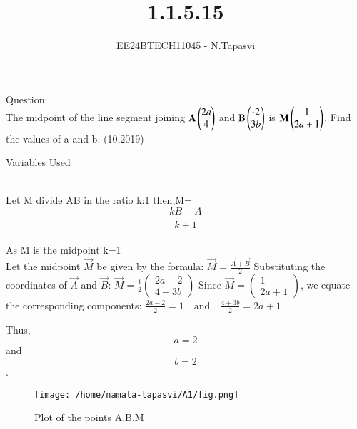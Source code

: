\documentclass[journal]{IEEEtran}
\begin{document}

\vspace{3cm}

\title{1.1.5.15}
\author{EE24BTECH11045 - N.Tapasvi}
{\let\newpage\relax\maketitle}
Question:\\
The midpoint of the line segment joining $\mathbf{A}\begin{pmatrix}2a\\4\end{pmatrix}$ and $\mathbf{B}\begin{pmatrix}\text{-}2\\3b\end{pmatrix}$ is $\mathbf{M}\begin{pmatrix}1\\2a+1\end{pmatrix}$. Find the values of a and b.
\hfill (10,2019)

\solution
\begin{table}[h!]    
  \centering
  
  \caption{Variables Used}
  \label{tab1-1.5-15}
\end{table}\\

Let M divide AB in the ratio k:1
then,M=$$\frac{kB+A}{k+1}$$\\

As M is the midpoint k=1\\

Let the midpoint $\vec{M}$ be given by the formula:
$\vec{M} = \frac{\vec{A} + \vec{B}}{2}$
Substituting the coordinates of $\vec{A}$ and $\vec{B}$:
$\vec{M} = \frac{1}{2} \begin{pmatrix} 2a - 2 \\ 4 + 3b \end{pmatrix}$
Since $\vec{M} = \begin{pmatrix} 1 \\ 2a+1 \end{pmatrix}$, we equate the corresponding components:
$\frac{2a - 2}{2} = 1 \quad \text{and} \quad \frac{4 + 3b}{2} = 2a + 1$

Thus, $$a = 2$$ and $$b = 2$$.


\begin{figure}[h!]
   \centering
	\texttt{[image: /home/namala-tapasvi/A1/fig.png]}
   \caption{Plot of the points A,B,M}
   \label{stemplot}
\end{figure}
\end{document}
